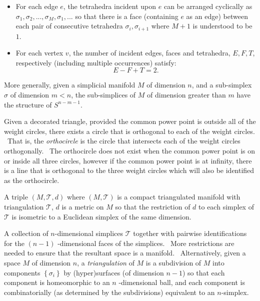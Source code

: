 \begin{description}
\begin{itemize}
\item For each edge $e$, the tetrahedra incident upon $e$ can be arranged
cyclically as $\sigma _{1},\sigma _{2},...,\sigma _{M},\sigma _{1},...$ so
that there is a face (containing $e$ as an edge) between each pair of
consecutive tetrahedra $\sigma _{i},\sigma _{i+1}$ where $M+1$ is understood
to be $1$. \ 

\item For each vertex $v$, the number of incident edges, faces and
tetrahedra, $E,F,T$, respectively (including multiple occurrences) satisfy:%
\begin{equation*}
E-F+T=2.
\end{equation*}
\end{itemize}

\item More generally, given a simplicial manifold $M$ of dimension $n$, and
a sub-simplex $\sigma $ of dimension $m<n$, the sub-simplices of $M$ of
dimension greater than $m$ have the structure of $S^{n-m-1}$.

\item[orthocircle] Given a decorated triangle, provided the common power
point is outside all of the weight circles, there exists a circle that is
orthogonal to each of the weight circles. \ That is, the \textit{orthocircle}
is the circle that intersects each of the weight circles orthogonally. \ The
orthocircle does not exist when the common power point is on or inside all
three circles, however if the common power point is at infinity, there is a
line that is orthogonal to the three weight circles which will also be
identified as the orthocircle.

\item[piecewise flat manifold] A triple $\left( M,\mathcal{T},d\right) $
where $\left( M,\mathcal{T}\right) $ is a compact triangulated manifold with
triangulation $\mathcal{T}$, $d$ is a metric on $M$ so that the restriction
of $d$ to each simplex of $\mathcal{T}$ is isometric to a Euclidean simplex
of the same dimension. \ 

\item[triangulation] A collection of $n$-dimensional simplices $\mathcal{T}$
together with pairwise identifications for the $\left( n-1\right) $%
-dimensional faces of the simplices. \ More restrictions are needed to
ensure that the resultant space is a manifold. \ Alternatively, given a
space $M$ of dimension $n$, a \textit{triangulation} of $M$ is a subdivision
of $M$ into components $\left\{ \sigma _{i}\right\} $ by (hyper)surfaces (of
dimension $n-1$) so that each component is homeomorphic to an $n$%
-dimensional ball, and each component is combinatorially (as determined by
the subdivisions) equivalent to an $n$-simplex. \ 


\end{description}
